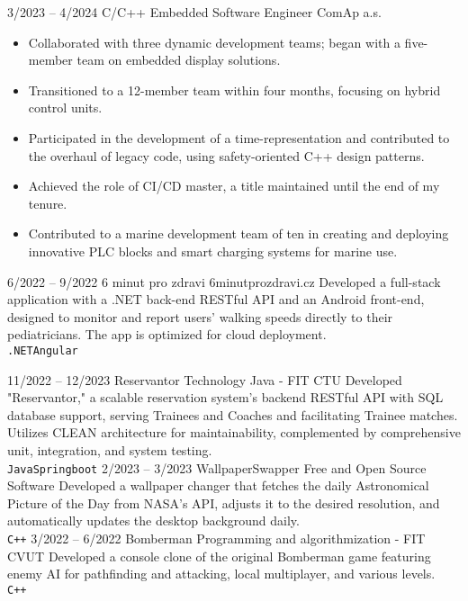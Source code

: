 \documentclass[9pt]{developercv} %
\begin{document}
\begin{entrylist}
	\entry
		{3/2023 -- 4/2024}
    	{C/C++ Embedded Software Engineer}
		{ComAp a.s.}
    	{
\begin{itemize}[itemsep=0pt, parsep=0pt] %
	\item Collaborated with three dynamic development teams; began with a five-member team on embedded display solutions.
	\item Transitioned to a 12-member team within four months, focusing on hybrid control units.
	\item Participated in the development of a time-representation and contributed to the overhaul of legacy code, using safety-oriented C++ design patterns.
	\item Achieved the role of CI/CD master, a title maintained until the end of my tenure.
	\item Contributed to a marine development team of ten in creating and deploying innovative PLC blocks and smart charging systems for marine use.
\end{itemize}
		}
	\entry
		{6/2022 -- 9/2022}
		{6 minut pro zdravi}
		{6minutprozdravi.cz}
		{Developed a full-stack application with a .NET back-end RESTful API and an Android front-end, designed to monitor and report users' walking speeds directly to their pediatricians. The app is optimized for cloud deployment.\\ \texttt{.NET}\slashsep\texttt{Angular}}
\end{entrylist}



\begin{entrylist}
	\entry
		{11/2022 -- 12/2023}
		{Reservantor}
		{Technology Java - FIT CTU}
		{Developed "Reservantor," a scalable reservation system's backend RESTful API with SQL database support, serving Trainees and Coaches and facilitating Trainee matches. Utilizes CLEAN architecture for maintainability, complemented by comprehensive unit, integration, and system testing.\\ \texttt{Java}\slashsep\texttt{Springboot}}
	\entry
		{2/2023 -- 3/2023}
		{WallpaperSwapper}
		{Free and Open Source Software}
		{Developed a wallpaper changer that fetches the daily Astronomical Picture of the Day from NASA's API, adjusts it to the desired resolution, and automatically updates the desktop background daily.\\ \texttt{C++}}
	\entry
		{3/2022 -- 6/2022}
		{Bomberman}
		{Programming and algorithmization - FIT CVUT}
		{Developed a console clone of the original Bomberman game featuring enemy AI for pathfinding and attacking, local multiplayer, and various levels.\\ \texttt{C++}}
\end{entrylist}
\end{document}
